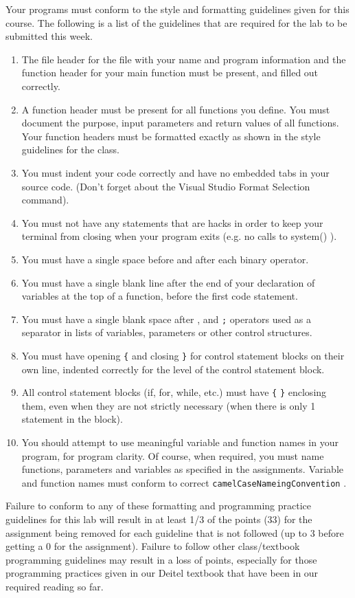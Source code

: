 \documentclass[11pt]{article}
\begin{document}
Your programs must conform to the style and formatting guidelines given for this course.
The following is a list of the guidelines that are required for the lab to be submitted
this week.

\begin{enumerate}
\item The file header for the file with your name and program information
and the function header for your main function must be present, and
filled out correctly.
\item A function header must be present for all functions you define.
You must document the purpose, input parameters and return values
of all functions.  Your function headers must be formatted exactly
as shown in the style guidelines for the class.
\item You must indent your code correctly and have no embedded tabs in
your source code. (Don't forget about the Visual Studio Format
Selection command).
\item You must not have any statements that are hacks in order to keep
your terminal from closing when your program exits (e.g. no calls
to system() ).
\item You must have a single space before and after each binary operator.
\item You must have a single blank line after the end of your declaration
of variables at the top of a function, before the first code
statement.
\item You must have a single blank space after , and \verb~;~ operators used as a
separator in lists of variables, parameters or other control
structures.
\item You must have opening \verb~{~ and closing \verb~}~ for control statement blocks
on their own line, indented correctly for the level of the control
statement block.
\item All control statement blocks (if, for, while, etc.) must have \verb~{~
\verb~}~ enclosing them, even when they are not strictly necessary
(when there is only 1 statement in the block).
\item You should attempt to use meaningful variable and function names in
your program, for program clarity.  Of course, when required, you
must name functions, parameters and variables as specified in the
assignments.  Variable and function names must conform to correct
\verb~camelCaseNameingConvention~ .
\end{enumerate}

Failure to conform to any of these formatting and programming practice
guidelines for this lab will result in at least 1/3 of the points (33)
for the assignment being removed for each guideline that is not
followed (up to 3 before getting a 0 for the assignment). Failure to
follow other class/textbook programming guidelines may result in a
loss of points, especially for those programming practices given in
our Deitel textbook that have been in our required reading so far.
\end{document}
